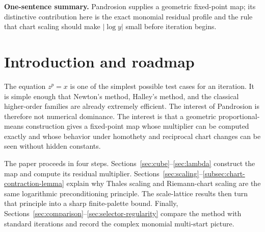 \documentclass[10pt,a4paper]{article}
\theoremstyle{plain}
\theoremstyle{definition}
\theoremstyle{remark}
\newenvironment{takeaway}{%
  \begin{center}\begin{minipage}{0.92\linewidth}\small\itshape\color{blue!45!black}%
}{%
  \end{minipage}\end{center}%
}
\begin{document}
\begin{abstract}
Finally, Aitken--Steffensen acceleration turns the linearly convergent map into
a derivative-free quadratically convergent map, with an explicit local error
constant.  The complex monomial extension is kept at the level needed for an
expository account: cyclotomic anchors, local seeding disks, and a finite
selector.  The result is a deliberately narrow but coherent account of the
Pandrosion monomial scheme: fixed point, contraction, scaling, reciprocal
charts, acceleration, and complex roots.
\end{abstract}

\begin{takeaway}
\textbf{One-sentence summary.}
Pandrosion supplies a geometric fixed-point map; its distinctive contribution here is the exact monomial residual profile and the rule that chart scaling should make $|\log y|$ small before iteration begins.
\end{takeaway}

\clearpage
\renewcommand{\contentsname}{Sommaire}
\tableofcontents
\clearpage


\section{Introduction and roadmap}
\label{sec:intro}

The equation $z^p=x$ is one of the simplest possible test cases for an
iteration.  It is simple enough that Newton's method, Halley's method, and the
classical higher-order families are already extremely efficient.  The interest
of Pandrosion is therefore not numerical dominance.  The interest is that a
geometric proportional-means construction gives a fixed-point map whose
multiplier can be computed exactly and whose behavior under homothety and
reciprocal chart changes can be seen without hidden constants.

The paper proceeds in four steps.  Sections~\ref{sec:cube}--\ref{sec:lambda}
construct the map and compute its residual multiplier.  Sections~\ref{sec:scaling}--\ref{subsec:chart-contraction-lemma}
explain why Thales scaling and Riemann-chart scaling are the same logarithmic
preconditioning principle.  The scale-lattice results then turn that principle
into a sharp finite-palette bound.  Finally, Sections~\ref{sec:comparison}--\ref{sec:selector-regularity}
compare the method with standard iterations and record the complex monomial
multi-start picture.
\end{document}
